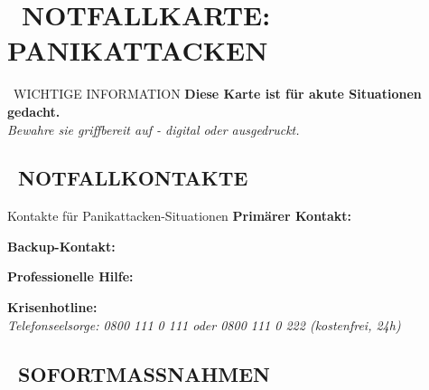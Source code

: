 
\newpage
\section*{\textcolor{ctmmRed}{\faHeartbeat~NOTFALLKARTE: PANIKATTACKEN}}
\label{sec:notfall-panikattacken}

\begin{ctmmRedBox}{\faExclamationTriangle~WICHTIGE INFORMATION}
\textbf{Diese Karte ist für akute Situationen gedacht.}\\
\textit{Bewahre sie griffbereit auf - digital oder ausgedruckt.}
\end{ctmmRedBox}

\subsection*{\textcolor{ctmmRed}{\faPhoneAlt~NOTFALLKONTAKTE}}

\begin{ctmmGrayBox}{Kontakte für Panikattacken-Situationen}
\textbf{Primärer Kontakt:}\\
 \quad {}

\vspace{0.3cm}
\textbf{Backup-Kontakt:}\\
 \quad {}

\vspace{0.3cm}
\textbf{Professionelle Hilfe:}\\
 \quad {}

\vspace{0.3cm}
\textbf{Krisenhotline:}\\
\textit{Telefonseelsorge: 0800 111 0 111 oder 0800 111 0 222 (kostenfrei, 24h)}
\end{ctmmGrayBox}

\subsection*{\textcolor{ctmmRed}{\faFirstAid~SOFORTMASSNAHMEN}}

